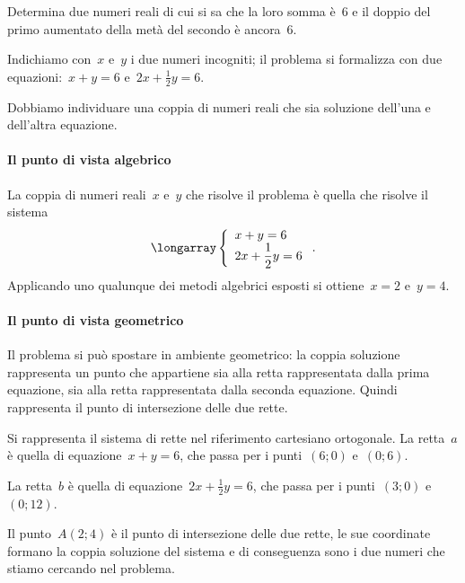 \begin{problema}
Determina due numeri reali di cui si sa che la loro somma è~6 e il
doppio del primo aumentato della metà del secondo è ancora~6.
\end{problema}

 \begin{soluzione}
Indichiamo con~$x$ e~$y$ i due numeri incogniti; il problema si formalizza
con due equazioni:~$x+y=6$ e~$2x+\frac{1}{2}y=6$.

Dobbiamo individuare una coppia di numeri reali che sia soluzione
dell'una e dell'altra equazione.

\paragraph{Il punto di vista algebrico}
La coppia di numeri reali~$x$ e~$y$ che risolve il problema è quella che
risolve il sistema
\[\longarray\left\{\begin{array}{l}x+y=6\\2x+\dfrac{1}{2}y=6 \end{array}\right..\]
Applicando uno qualunque dei metodi algebrici esposti si ottiene~$x=2$ e~$y=4$.

\paragraph{Il punto di vista geometrico}

Il problema si può spostare in ambiente geometrico: la coppia
soluzione rappresenta un punto che appartiene sia alla retta
rappresentata dalla prima equazione, sia alla retta rappresentata dalla
seconda equazione. Quindi rappresenta il punto di intersezione delle due rette.

Si rappresenta il sistema di rette nel riferimento cartesiano ortogonale.
La retta~$a$ è quella di equazione~$x+y=6$, che passa per i
punti~$(6;0)$ e~$(0;6)$.

La retta~$b$ è quella di equazione~$2x+\frac{1}{2}y=6$, che
passa per i punti~$(3;0)$ e~$(0;12)$.

Il punto~$A(2;4)$ è il punto di intersezione delle due rette, le sue
coordinate formano la coppia soluzione del sistema e di conseguenza
sono i due numeri che stiamo cercando nel problema.

\begin{center}
 
\end{center}
 \end{soluzione}

